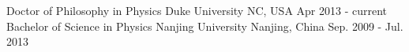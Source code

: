 

\begin{cventries}

  \cventry
    {Doctor of Philosophy in Physics} %
    {Duke University} %
    {NC, USA} %
    {Apr 2013 - current} %
	{
	}
    \vspace{-0.2cm}
    \cventry
      {Bachelor of Science in Physics} %
      {Nanjing University} %
      {Nanjing, China} %
      {Sep. 2009 - Jul. 2013} %
      {
      }
   \vspace{-0.6cm}

\end{cventries}
